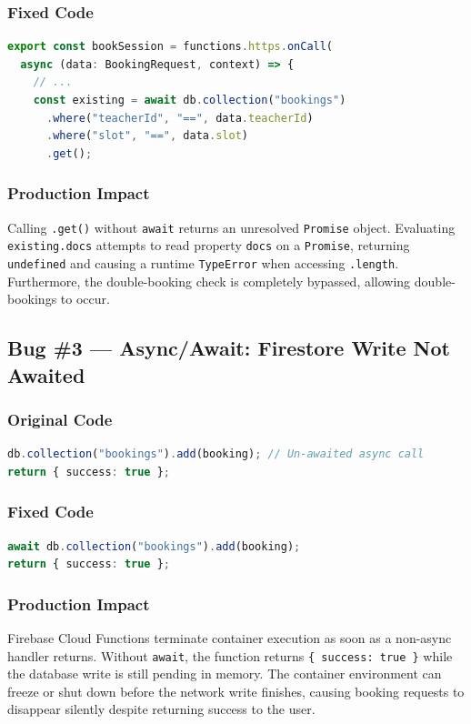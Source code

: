\documentclass[11pt, a4paper]{article}
\begin{document}
\subsubsection*{Fixed Code}
\begin{lstlisting}[language=TypeScript]
export const bookSession = functions.https.onCall(
  async (data: BookingRequest, context) => {
    // ...
    const existing = await db.collection("bookings")
      .where("teacherId", "==", data.teacherId)
      .where("slot", "==", data.slot)
      .get();
\end{lstlisting}

\subsubsection*{Production Impact}
Calling \texttt{.get()} without \texttt{await} returns an unresolved \texttt{Promise} object. Evaluating \texttt{existing.docs} attempts to read property \texttt{docs} on a \texttt{Promise}, returning \texttt{undefined} and causing a runtime \texttt{TypeError} when accessing \texttt{.length}. Furthermore, the double-booking check is completely bypassed, allowing double-bookings to occur.

\newpage

\subsection{Bug \#3 --- Async/Await: Firestore Write Not Awaited}

\subsubsection*{Original Code}
\begin{lstlisting}[language=TypeScript]
db.collection("bookings").add(booking); // Un-awaited async call
return { success: true };
\end{lstlisting}

\subsubsection*{Fixed Code}
\begin{lstlisting}[language=TypeScript]
await db.collection("bookings").add(booking);
return { success: true };
\end{lstlisting}

\subsubsection*{Production Impact}
Firebase Cloud Functions terminate container execution as soon as a non-async handler returns. Without \texttt{await}, the function returns \texttt{\{ success: true \}} while the database write is still pending in memory. The container environment can freeze or shut down before the network write finishes, causing booking requests to disappear silently despite returning success to the user.
\end{document}
